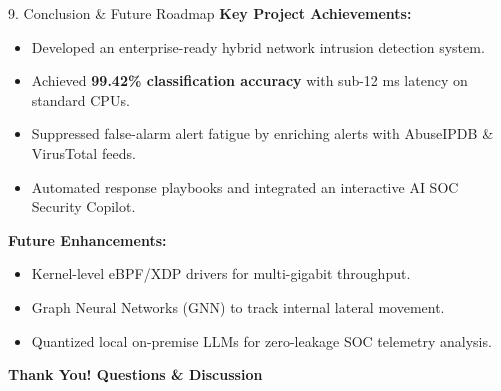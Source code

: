 ﻿\documentclass[aspectratio=169, 10pt]{beamer}
\begin{document}
\begin{frame}{9. Conclusion \& Future Roadmap}
    \textbf{Key Project Achievements:}
    \begin{itemize}
        \item Developed an enterprise-ready hybrid network intrusion detection system.
        \item Achieved \textbf{99.42\% classification accuracy} with sub-12 ms latency on standard CPUs.
        \item Suppressed false-alarm alert fatigue by enriching alerts with AbuseIPDB \& VirusTotal feeds.
        \item Automated response playbooks and integrated an interactive AI SOC Security Copilot.
    \end{itemize}

    \vspace{0.3cm}
    \textbf{Future Enhancements:}
    \begin{itemize}
        \item Kernel-level eBPF/XDP drivers for multi-gigabit throughput.
        \item Graph Neural Networks (GNN) to track internal lateral movement.
        \item Quantized local on-premise LLMs for zero-leakage SOC telemetry analysis.
    \end{itemize}
    
    \vspace{0.4cm}
    \centering
    {\large \textbf{\color{primaryblue} Thank You! Questions \& Discussion}}
\end{frame}
\end{document}
